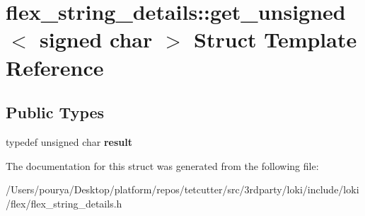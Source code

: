 \hypertarget{structflex__string__details_1_1get__unsigned_3_01signed_01char_01_4}{}\section{flex\+\_\+string\+\_\+details\+:\+:get\+\_\+unsigned$<$ signed char $>$ Struct Template Reference}
\label{structflex__string__details_1_1get__unsigned_3_01signed_01char_01_4}
\subsection*{Public Types}
\begin{DoxyCompactItemize}
\item 
\hypertarget{structflex__string__details_1_1get__unsigned_3_01signed_01char_01_4_aa48d47908845597b9646457f8fb4f339}{}typedef unsigned char {\bfseries result}\label{structflex__string__details_1_1get__unsigned_3_01signed_01char_01_4_aa48d47908845597b9646457f8fb4f339}

\end{DoxyCompactItemize}


The documentation for this struct was generated from the following file\+:\begin{DoxyCompactItemize}
\item 
/\+Users/pourya/\+Desktop/platform/repos/tetcutter/src/3rdparty/loki/include/loki/flex/flex\+\_\+string\+\_\+details.\+h\end{DoxyCompactItemize}
